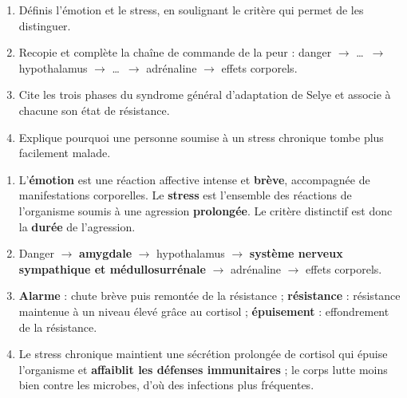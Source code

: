 \documentclass[11pt]{article}
\begin{document}
\begin{exercice}
\begin{enumerate}
\item Définis l'émotion et le stress, en soulignant le critère qui permet de les distinguer.
\item Recopie et complète la chaîne de commande de la peur : danger $\rightarrow$ \ldots\ $\rightarrow$ hypothalamus $\rightarrow$ \ldots\ $\rightarrow$ adrénaline $\rightarrow$ effets corporels.
\item Cite les trois phases du syndrome général d'adaptation de Selye et associe à chacune son état de résistance.
\item Explique pourquoi une personne soumise à un stress chronique tombe plus facilement malade.
\end{enumerate}
\end{exercice}

\begin{corrige}
\begin{enumerate}
\item L'\textbf{émotion} est une réaction affective intense et \textbf{brève}, accompagnée de manifestations corporelles. Le \textbf{stress} est l'ensemble des réactions de l'organisme soumis à une agression \textbf{prolongée}. Le critère distinctif est donc la \textbf{durée} de l'agression.
\item Danger $\rightarrow$ \textbf{amygdale} $\rightarrow$ hypothalamus $\rightarrow$ \textbf{système nerveux sympathique et médullosurrénale} $\rightarrow$ adrénaline $\rightarrow$ effets corporels.
\item \textbf{Alarme} : chute brève puis remontée de la résistance ; \textbf{résistance} : résistance maintenue à un niveau élevé grâce au cortisol ; \textbf{épuisement} : effondrement de la résistance.
\item Le stress chronique maintient une sécrétion prolongée de cortisol qui épuise l'organisme et \textbf{affaiblit les défenses immunitaires} ; le corps lutte moins bien contre les microbes, d'où des infections plus fréquentes.
\end{enumerate}
\end{corrige}
\end{document}
